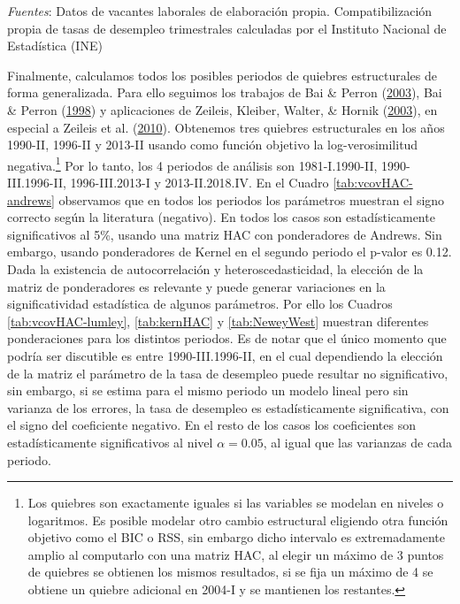 \documentclass[12pt,oneside]{reedthesis}
\begin{document}
\begin{table}[!h]
\begin{threeparttable}
\begin{tablenotes}
\textit{Fuentes}: Datos de vacantes laborales de elaboración propia. Compatibilización propia de tasas de desempleo trimestrales calculadas por el Instituto Nacional de Estadística (INE)
\end{tablenotes}
\end{threeparttable}
\end{table}
Finalmente, calculamos todos los posibles periodos de quiebres estructurales de forma generalizada. Para ello seguimos los trabajos de Bai \& Perron (\protect\hyperlink{ref-BaiPerron2003}{2003}), Bai \& Perron (\protect\hyperlink{ref-BaiPerron1998}{1998}) y aplicaciones de Zeileis, Kleiber, Walter, \& Hornik (\protect\hyperlink{ref-Zeileis2003}{2003}), en especial a Zeileis et al. (\protect\hyperlink{ref-Zeileis2010}{2010}). Obtenemos tres quiebres estructurales en los años 1990-II, 1996-II y 2013-II usando como función objetivo la log-verosimilitud negativa.\footnote{Los quiebres son exactamente iguales si las variables se modelan en niveles o logaritmos. Es posible modelar otro cambio estructural eligiendo otra función objetivo como el BIC o RSS, sin embargo dicho intervalo es extremadamente amplio al computarlo con una matriz HAC, al elegir un máximo de 3 puntos de quiebres se obtienen los mismos resultados, si se fija un máximo de 4 se obtiene un quiebre adicional en 2004-I y se mantienen los restantes.} Por lo tanto, los 4 periodos de análisis son 1981-I.1990-II, 1990-III.1996-II, 1996-III.2013-I y 2013-II.2018.IV. En el Cuadro \ref{tab:vcovHAC-andrews} observamos que en todos los periodos los parámetros muestran el signo correcto según la literatura (negativo). En todos los casos son estadísticamente significativos al 5\%, usando una matriz HAC con ponderadores de Andrews. Sin embargo, usando ponderadores de Kernel en el segundo periodo el p-valor es 0.12. Dada la existencia de autocorrelación y heteroscedasticidad, la elección de la matriz de ponderadores es relevante y puede generar variaciones en la significatividad estadística de algunos parámetros. Por ello los Cuadros \ref{tab:vcovHAC-lumley}, \ref{tab:kernHAC} y \ref{tab:NeweyWest} muestran diferentes ponderaciones para los distintos periodos. Es de notar que el único momento que podría ser discutible es entre 1990-III.1996-II, en el cual dependiendo la elección de la matriz el parámetro de la tasa de desempleo puede resultar no significativo, sin embargo, si se estima para el mismo periodo un modelo lineal pero sin varianza de los errores, la tasa de desempleo es estadísticamente significativa, con el signo del coeficiente negativo. En el resto de los casos los coeficientes son estadísticamente significativos al nivel \(\alpha = 0.05\), al igual que las varianzas de cada periodo.
\end{document}
